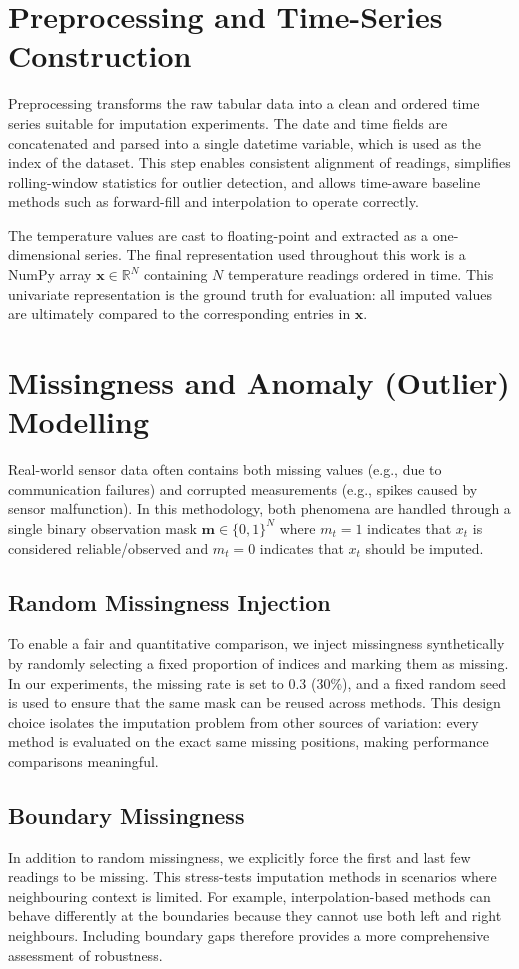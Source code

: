 \section{Preprocessing and Time-Series Construction}
Preprocessing transforms the raw tabular data into a clean and ordered time series suitable for imputation experiments. The date and time fields are concatenated and parsed into a single datetime variable, which is used as the index of the dataset. This step enables consistent alignment of readings, simplifies rolling-window statistics for outlier detection, and allows time-aware baseline methods such as forward-fill and interpolation to operate correctly.

The temperature values are cast to floating-point and extracted as a one-dimensional series. The final representation used throughout this work is a NumPy array $\mathbf{x} \in \mathbb{R}^{N}$ containing $N$ temperature readings ordered in time. This univariate representation is the ground truth for evaluation: all imputed values are ultimately compared to the corresponding entries in $\mathbf{x}$.

\section{Missingness and Anomaly (Outlier) Modelling}
Real-world sensor data often contains both missing values (e.g., due to communication failures) and corrupted measurements (e.g., spikes caused by sensor malfunction). In this methodology, both phenomena are handled through a single binary observation mask $\mathbf{m} \in \{0,1\}^{N}$ where $m_t=1$ indicates that $x_t$ is considered reliable/observed and $m_t=0$ indicates that $x_t$ should be imputed.

\subsection{Random Missingness Injection}
To enable a fair and quantitative comparison, we inject missingness synthetically by randomly selecting a fixed proportion of indices and marking them as missing. In our experiments, the missing rate is set to 0.3 (30\%), and a fixed random seed is used to ensure that the same mask can be reused across methods. This design choice isolates the imputation problem from other sources of variation: every method is evaluated on the exact same missing positions, making performance comparisons meaningful.

\subsection{Boundary Missingness}
In addition to random missingness, we explicitly force the first and last few readings to be missing. This stress-tests imputation methods in scenarios where neighbouring context is limited. For example, interpolation-based methods can behave differently at the boundaries because they cannot use both left and right neighbours. Including boundary gaps therefore provides a more comprehensive assessment of robustness.

